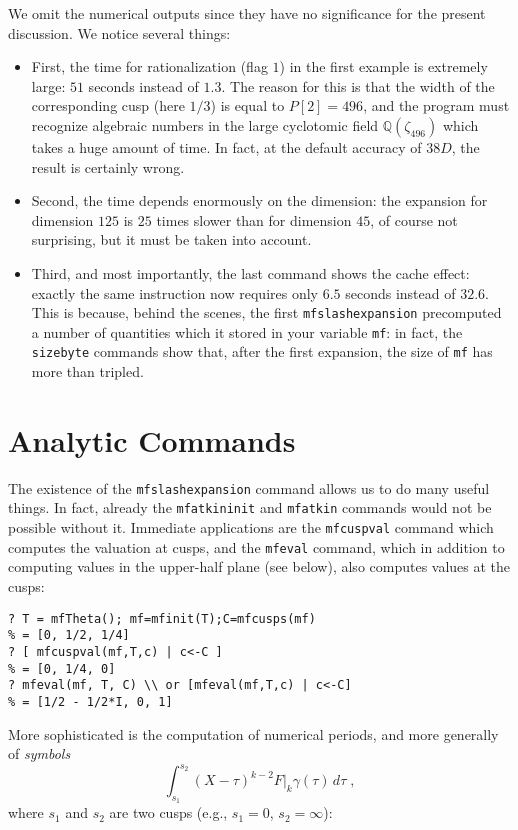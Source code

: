 \documentclass[11pt]{article}
\newcommand{\Q}{{\mathbb Q}}
\newcommand{\ga}{\gamma}
\def\kbd#1{{\tt #1}}
\begin{document}
We omit the numerical outputs since they have no significance for the present
discussion. We notice several things:
\begin{itemize}
\item First, the time for rationalization (flag $1$) in the first example
is extremely large: $51$ seconds instead of $1.3$. The reason for this is
that the width of the corresponding cusp (here $1/3$) is equal to $P[2]=496$,
and the program must recognize algebraic numbers in the large cyclotomic
field $\Q(\zeta_{496})$ which takes a huge amount of time. In fact, at the
default accuracy of $38D$, the result is certainly wrong.
\item Second, the time depends enormously on the dimension: the expansion
for dimension $125$ is $25$ times slower than for dimension $45$, of course
not surprising, but it must be taken into account.
\item Third, and most importantly, the last command shows the cache effect:
exactly the same instruction now requires only $6.5$ seconds instead of
$32.6$. This is because, behind the scenes, the first \kbd{mfslashexpansion}
precomputed a number of quantities which it stored in your variable \kbd{mf}:
in fact, the \kbd{sizebyte} commands show that, after the first expansion,
the size of \kbd{mf} has more than tripled.
\end{itemize}

\section{Analytic Commands}

The existence of the \kbd{mfslashexpansion} command allows us to do many
useful things. In fact, already the \kbd{mfatkininit} and \kbd{mfatkin}
commands would not be possible without it. Immediate applications are the
\kbd{mfcuspval} command which computes the valuation at cusps, and the
\kbd{mfeval} command, which in addition to computing values in the upper-half
plane (see below), also computes values at the cusps:

\begin{verbatim}
? T = mfTheta(); mf=mfinit(T);C=mfcusps(mf)
% = [0, 1/2, 1/4]
? [ mfcuspval(mf,T,c) | c<-C ]
% = [0, 1/4, 0]
? mfeval(mf, T, C) \\ or [mfeval(mf,T,c) | c<-C]
% = [1/2 - 1/2*I, 0, 1]
\end{verbatim}

More sophisticated is the computation of numerical periods, and more
generally of \emph{symbols}
$$\int_{s_1}^{s_2}(X-\tau)^{k-2}F|_k\ga(\tau)\,d\tau\;,$$
where $s_1$ and $s_2$ are two cusps (e.g., $s_1=0$, $s_2=\infty$):
\end{document}

